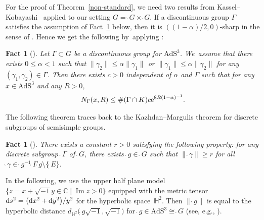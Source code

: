 \documentclass[10pt,a4paper]{amsart}
\numberwithin{equation}{section}
\newtheorem{Fact}[Theorem]{Fact}
 { \theoremstyle{definition}
\newtheorem{Definition}[Theorem]{Definition}
\newtheorem{Note}[Theorem]{Note}
\newtheorem{Example}[Theorem]{Example}
\newtheorem{Remark}[Theorem]{Remark}
\newtheorem{Setting}[Theorem]{Setting}
\newtheorem{Notation}[Theorem]{Notation}
}
\begin{document}
For the proof of Theorem~\ref{non-standard}, we need two results
from Kassel--Kobayashi~\cite{KaKob16} applied to our setting
$G=\grave{\ }G\times\grave{\ }G$.
If a discontinuous group
$\Gamma$ satisfies the assumption of Fact~\ref{alphacounting} below,
then it is $((1-\alpha)/2,0)$-sharp
in the sense of \cite[Definition~4.2]{KaKob16}.
Hence we get the following by~applying \cite[Lemma~4.6.4]{KaKob16}:
\begin{Fact}[\cite{KaKob16}]
\label{alphacounting}
Let $\Gamma \subset G$ be a discontinuous group for $\mathrm{AdS}^{3}$. We~assume that there exists $0\leq\alpha<1$ such that
$\|\gamma_2\|\leq\alpha\|\gamma_1\|$ or $\|\gamma_1\|\leq\alpha\|\gamma_2\|$
for any $(\gamma_1,\gamma_2)\in\Gamma$.
Then there exists $c>0$ independent of $\alpha$ and $\Gamma$
such that for any $x\in\mathrm{AdS}^3$ and any $R>0$,
\begin{gather*}
N_{\Gamma}(x,R)\leq \#(\Gamma\cap K)c{\rm e}^{8R(1-\alpha)^{-1}}.
\end{gather*}
\end{Fact}

The following theorem
traces back to the Kazhdan--Margulis theorem for discrete subgroups of
semisimple groups.
\begin{Fact}[{\cite[Proposition~8.14]{KaKob16}}]
\label{Kazhdan-Margulis}
There exists a constant $r>0$ satisfying the following property:
for any discrete subgroup $\grave{\ }\Gamma$ of $\grave{\ }G$,
there exists $\grave{\ }g \in \grave{\ }G$ such that
$\|\grave{\ }\gamma\|\geq r$ for all
$\grave{\ }\gamma\in
\grave{\ }g^{-1}\grave{\ }\Gamma \grave{\ }g\setminus\{\grave{\ }E\}$.
\end{Fact}

In the following, we use the upper half plane model
$\big\{z=x+\sqrt{-1}y\in\mathbb{C}\mid \operatorname{Im}z>0\big\}$
equipped with the metric tensor ${\rm d}s^2=\big({\rm d}x^2+{\rm d}y^2\big)/y^2$
for the hyperbolic space~$\mathbb{H}^2$.
Then $\|\grave{\ }g\|$ is equal to the hyperbolic distance
$d_{\mathbb{H}^{2}}\big(\grave{\ }g\sqrt{-1},\sqrt{-1}\big)$
for $\grave{\ }g\in\mathrm{AdS}^{3}\cong\grave{\ }G$ (see, e.g., \cite[equation~(A.1)]{GuKa17}).
\end{document}
